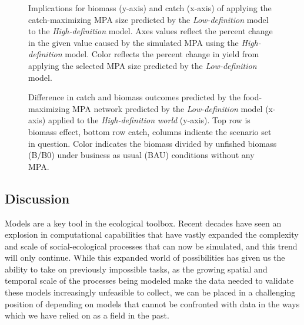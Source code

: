\documentclass[
  default,
  lineno,
  referee]{sn-jnl}
\begin{document}
\begin{figure}


\caption{\label{fig-imps}Implications for biomass (y-axis) and catch
(x-axis) of applying the catch-maximizing MPA size predicted by the
\emph{Low-definition} model to the \emph{High-definition} model. Axes
values reflect the percent change in the given value caused by the
simulated MPA using the \emph{High-definition} model. Color reflects the
percent change in yield from applying the selected MPA size predicted by
the \emph{Low-definition} model.}

\end{figure}%

\begin{figure}


\caption{\label{fig-imps2}Difference in catch and biomass outcomes
predicted by the food-maximizing MPA network predicted by the
\emph{Low-definition} model (x-axis) applied to the
\emph{High-definition world} (y-axis). Top row is biomass effect, bottom
row catch, columns indicate the scenario set in question. Color
indicates the biomass divided by unfished biomass (B/B0) under business
as usual (BAU) conditions without any MPA.}

\end{figure}%

\subsection{Discussion}\label{discussion}

Models are a key tool in the ecological toolbox. Recent decades have
seen an explosion in computational capabilities that have vastly
expanded the complexity and scale of social-ecological processes that
can now be simulated, and this trend will only continue. While this
expanded world of possibilities has given us the ability to take on
previously impossible tasks, as the growing spatial and temporal scale
of the processes being modeled make the data needed to validate these
models increasingly unfeasible to collect, we can be placed in a
challenging position of depending on models that cannot be confronted
with data in the ways which we have relied on as a field in the past.
\end{document}
